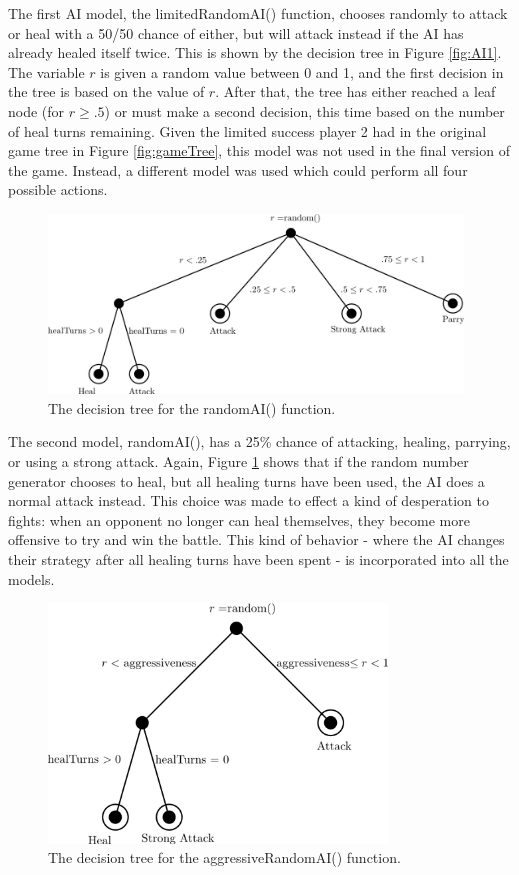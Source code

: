 The first AI model, the limitedRandomAI() function, chooses randomly to attack or heal with a 50/50 chance of either, but will attack instead if the AI has already healed itself twice. This is shown by the decision tree in Figure \ref{fig:AI1}. The variable $r$ is given a random value between 0 and 1, and the first decision in the tree is based on the value of $r$. After that, the tree has either reached a leaf node (for $r\ge .5$) or must make a second decision, this time based on the number of heal turns remaining. Given the limited success player 2 had in the original game tree in Figure \ref{fig:gameTree}, this model was not used in the final version of the game. Instead, a different model was used which could perform all four possible actions.\\

\begin{figure}[H]
  \centering
  \includegraphics[width=11cm]{figures/AIRandom.png}
  \caption{The decision tree for the randomAI() function.}
  \label{fig:AI2}
\end{figure}
The second model, randomAI(), has a 25\% chance of attacking, healing, parrying, or using a strong attack. Again, Figure \ref{fig:AI2} shows that if the random number generator chooses to heal, but all healing turns have been used, the AI does a normal attack instead. This choice was made to effect a kind of desperation to fights: when an opponent no longer can heal themselves, they become more offensive to try and win the battle. This kind of behavior - where the AI changes their strategy after all healing turns have been spent - is incorporated into all the models.\\

\begin{figure}[H]
  \centering
  \includegraphics[width=9cm]{figures/AIAgressive.png}
  \caption{The decision tree for the aggressiveRandomAI() function.}
  \label{fig:AI3}
\end{figure}

